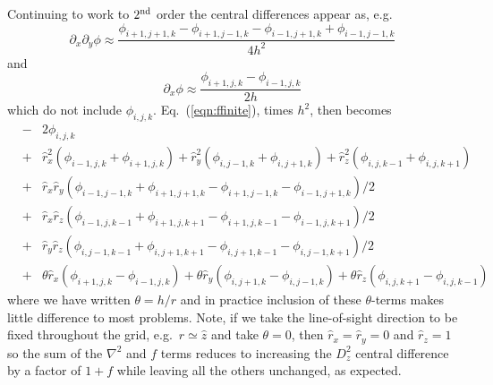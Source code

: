 \documentclass[a4paper,11pt]{article}
\begin{document}
Continuing to work to $2^{\rm nd}$ order the central differences appear as, e.g.
\begin{equation}
  \partial_x\partial_y\phi \approx
  \frac{\phi_{i+1,j+1,k}-\phi_{i+1,j-1,k}-\phi_{i-1,j+1,k}+\phi_{i-1,j-1,k}}
       {4h^2}
\end{equation}
and
\begin{equation}
  \partial_x\phi \approx \frac{\phi_{i+1,j,k}-\phi_{i-1,j,k}}{2h}
\end{equation}
which do not include $\phi_{i,j,k}$.
Eq.~(\ref{eqn:ffinite}), times $h^2$, then becomes
\begin{eqnarray}
  &-& 2\phi_{i,j,k} \nonumber \\
  &+&\hat{r}_x^2 \left( \phi_{i-1,j,k}+\phi_{i+1,j,k} \right)
   + \hat{r}_y^2 \left( \phi_{i,j-1,k}+\phi_{i,j+1,k} \right)
   + \hat{r}_z^2 \left( \phi_{i,j,k-1}+\phi_{i,j,k+1} \right)   \nonumber \\
  &+&\hat{r}_x\hat{r}_y\left( \phi_{i-1,j-1,k}+\phi_{i+1,j+1,k}
                             -\phi_{i+1,j-1,k}-\phi_{i-1,j+1,k} \right)/2
      \nonumber \\
  &+&\hat{r}_x\hat{r}_z\left( \phi_{i-1,j,k-1}+\phi_{i+1,j,k+1}
                             -\phi_{i+1,j,k-1}-\phi_{i-1,j,k+1} \right)/2
      \nonumber \\
  &+&\hat{r}_y\hat{r}_z\left( \phi_{i,j-1,k-1}+\phi_{i,j+1,k+1}
                             -\phi_{i,j+1,k-1}-\phi_{i,j-1,k+1} \right)/2
      \nonumber \\
  &+&\theta\hat{r}_x\left(\phi_{i+1,j,k}-\phi_{i-1,j,k}\right)
   + \theta\hat{r}_y\left(\phi_{i,j+1,k}-\phi_{i,j-1,k}\right)
   + \theta\hat{r}_z\left(\phi_{i,j,k+1}-\phi_{i,j,k-1}\right)
\end{eqnarray}
where we have written $\theta=h/r$ and in practice inclusion of these
$\theta$-terms makes little difference to most problems.
Note, if we take the line-of-sight direction to be fixed throughout the grid,
e.g.~$\hat{r}\simeq\hat{z}$ and take $\theta=0$, then $\hat{r}_x=\hat{r}_y=0$
and $\hat{r}_z=1$ so the sum of the $\nabla^2$ and $f$ terms reduces to
increasing the $D_z^2$ central difference by a factor of $1+f$ while leaving
all the others unchanged, as expected.
\end{document}
